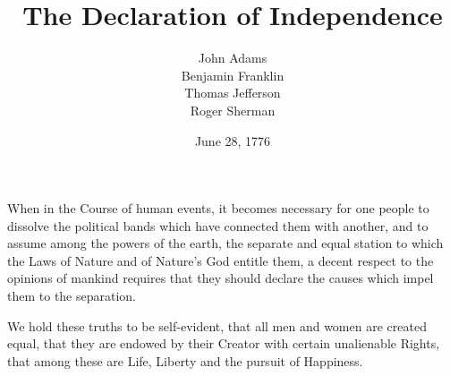 \documentclass{article}
\title{The Declaration of Independence}
\author{John Adams\\
Benjamin Franklin\\
Thomas Jefferson\\
Roger Sherman}
\date{June 28, 1776}
\begin{document}
\maketitle

When in the Course of human events, it becomes necessary for one people to dissolve the political bands which have connected them with another, and to assume among the powers of the earth, the separate and equal station to which the Laws of Nature and of Nature's God entitle them, a decent respect to the opinions of mankind requires that they should declare the causes which impel them to the separation. 

We hold these truths to be self-evident, that all men and women are created equal, that they are endowed by their Creator with certain unalienable Rights, that among these are Life, Liberty and the pursuit of Happiness.
\end{document}

